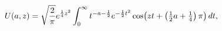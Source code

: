\[\mathop{U\/}\nolimits\!\left(a,z\right)=\sqrt{\frac{2}{\pi}}e^{\frac{1}{4}z^{2%
}}\*\int_{0}^{\infty}t^{-a-\frac{1}{2}}e^{-\frac{1}{2}t^{2}}\mathop{\cos\/}%
\nolimits\!\left(zt+\left(\tfrac{1}{2}a+\tfrac{1}{4}\right)\pi\right)dt,\]